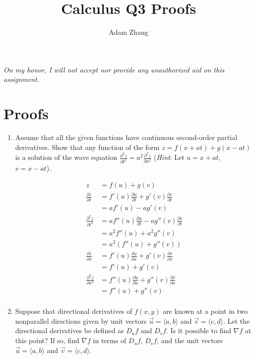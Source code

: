 \documentclass[11pt]{article}
\title{Calculus Q3 Proofs}
\author{Adam Zhang}
\begin{document}
\pagestyle{fancy}

\begin{center}
  \emph{On my honor, I will not accept nor provide any unauthorized aid on this assignment.}
\end{center}

\section*{Proofs}
\begin{enumerate}
\item Assume that all the given functions have continuous second-order partial
  derivatives. Show that any function of the form \(z = f(x + at) + g(x - at) \)
  is a solution of the wave equation \(\frac{\partial^2 z}{\partial t^2} = a^2
  \frac{\partial^2 z}{\partial x^2}\) (\textit{Hint}: Let \( u = x + at \), \( v
  = x - at \)).

  \begin{align*}
    z &= f(u) + g(v) \\
    \frac{\partial z}{\partial t}
      &= f'(u) \frac{\partial u}{\partial t} + g'(v) \frac{\partial
        v}{\partial t} \\
      &= a f'(u) -a g'(v) \\
    \frac{\partial^2 z}{\partial t^2}
      &= a f''(u) \frac{\partial u}{\partial t} - a g''(v) \frac{\partial
        v}{\partial t} \\
      &= a^2 f''(u) + a^2 g''(v) \\
      &= a^2 (f''(u) + g''(v)) \\
    \frac{\partial z}{\partial x}
    &= f'(u) \frac{\partial u}{\partial x} + g'(v) \frac{\partial v}{\partial x}
    \\
      &= f'(u) + g'(v) \\
    \frac{\partial^2 z}{\partial x^2}
    &= f''(u) \frac{\partial u}{\partial x} + g''(v) \frac{\partial v}{\partial x} \\
    &= f''(u) + g''(v) \\
  \end{align*}

\item Suppose that directional derivatives of \(f(x,y)\) are known at a point in two nonparallel directions given by unit vectors \(\vec{u} = \langle a, b \rangle\) and \(\vec{v} = \langle c, d \rangle\). Let the directional derivatives be defined as \(D_{u} f\) and \(D_{v} f\). Is it possible to find \( \nabla f \) at this point? If so, find \( \nabla f \) in terms of \( D_{u} f \), \( D_{v} f \), and the unit vectors \(\vec{u} = \langle a, b \rangle\) and \(\vec{v} = \langle c, d \rangle\).


\end{enumerate}
\end{document}
